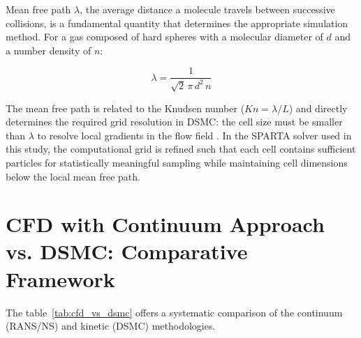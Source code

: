 Mean free path $\lambda$, the average distance a molecule travels between successive collisions, is a fundamental quantity that determines the appropriate simulation method. For a gas composed of hard spheres with a molecular diameter of $d$ and a number density of $n$:

\begin{equation}
    \lambda = \frac{1}{\sqrt{2} \, \pi \, d^2 \, n}
    \label{eq:mean_free_path}
\end{equation}

\noindent The mean free path is related to the Knudsen number ($Kn = \lambda / L$) and directly determines the required grid resolution in DSMC: the cell size must be smaller than $\lambda$ to resolve local gradients in the flow field \cite{bird1994molecular}. In the SPARTA solver used in this study, the computational grid is refined such that each cell contains sufficient particles for statistically meaningful sampling while maintaining cell dimensions below the local mean free path.

\section{CFD with Continuum Approach vs. DSMC: Comparative Framework}

The table~\ref{tab:cfd_vs_dsmc} offers a systematic comparison of the continuum (RANS/NS) and kinetic (DSMC) methodologies.

